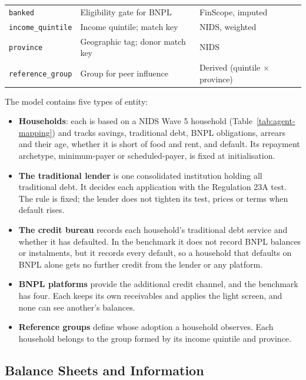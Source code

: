 \begin{table}[p]
\begin{tabular}{H{4.25cm}L{6.0cm}L{3.15cm}}
\addlinespace
\texttt{banked} & Eligibility gate for \ac{BNPL} & FinScope, imputed \\
\addlinespace
\texttt{income\_quintile} & Income quintile; match key & NIDS, weighted \\
\addlinespace
\texttt{province} & Geographic tag; donor match key & NIDS \\
\addlinespace
\texttt{reference\_group} & Group for peer influence & Derived (quintile $\times$ province) \\
\bottomrule
\end{tabular}
\endgroup
\end{table}

The model contains five types of entity:
\begin{itemize}
    \item \textbf{Households}: each is based on a \ac{NIDS} Wave 5 household
    (Table~\ref{tab:agent-mapping}) and tracks savings, traditional debt,
    \ac{BNPL} obligations, arrears and their age, whether it is short of food and rent, and default. Its repayment archetype,
    minimum-payer or scheduled-payer, is fixed at initialisation.
    \item \textbf{The traditional lender} is one consolidated institution
    holding all traditional debt. It decides each application with the Regulation 23A
    test. The rule is fixed; the lender does not tighten its test, prices or terms
    when default rises.
    \item \textbf{The credit bureau} records each household's traditional debt service and
    whether it has defaulted. In the benchmark it does not record \ac{BNPL} balances or
    instalments, but it records every default, so a household that defaults on \ac{BNPL} alone
    gets no further credit from the lender or any platform.
    \item \textbf{\ac{BNPL} platforms} provide the additional credit channel, and the benchmark
    has four. Each keeps its own receivables and applies the light screen, and none can see
    another's balances.
    \item \textbf{Reference groups} define whose adoption a household observes.
    Each household belongs to the group formed by its income quintile and province.
\end{itemize}

\subsection{Balance Sheets and Information}
\label{sec:asymmetry}

